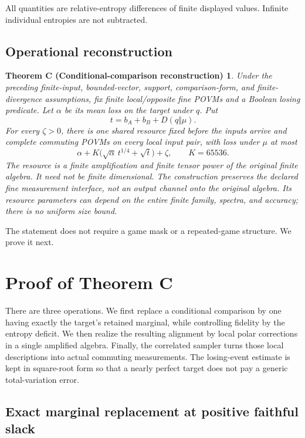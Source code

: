 \documentclass[11pt,reqno]{amsart}
\newtheorem*{theoremC}{Theorem C (Conditional-comparison reconstruction)}
\numberwithin{equation}{section}
\begin{document}
All quantities are relative-entropy differences of finite displayed values. Infinite individual entropies are not subtracted.

\subsection{Operational reconstruction}\label{operational-reconstruction}

\begin{theoremC}
Under the preceding finite-input, bounded-vector, support, comparison-form, and finite-divergence assumptions, fix finite local/opposite fine POVMs and a Boolean losing predicate. Let \(\alpha\) be its mean loss on the target under \(q\). Put
\[
 t=b_A+b_B+D(q\Vert\mu).
\]
For every \(\zeta>0\), there is one shared resource fixed before the inputs arrive and complete commuting POVMs on \emph{every} local input pair, with loss under \(\mu\) at most
\[
 \boxed{\alpha+K\big(\sqrt\alpha\,t^{1/4}+\sqrt t\big)+\zeta,
 \qquad K=65536.} \tag{3.4}
\]
The resource is a finite amplification and finite tensor power of the original finite algebra. It need not be finite dimensional. The construction preserves the declared fine measurement interface, not an output channel onto the original algebra. Its resource parameters can depend on the entire finite family, spectra, and accuracy; there is no uniform size bound.

\end{theoremC}

The statement does not require a game mask or a repeated-game structure. We prove it next.

\section{Proof of Theorem C}\label{proof-of-theorem-c}

There are three operations. We first replace a conditional comparison by one having exactly the target's retained marginal, while controlling fidelity by the entropy deficit. We then realize the resulting alignment by local polar corrections in a single amplified algebra. Finally, the correlated sampler turns those local descriptions into actual commuting measurements. The losing-event estimate is kept in square-root form so that a nearly perfect target does not pay a generic total-variation error.

\subsection{Exact marginal replacement at positive faithful slack}\label{exact-marginal-replacement-at-positive-faithful-slack}
\end{document}

